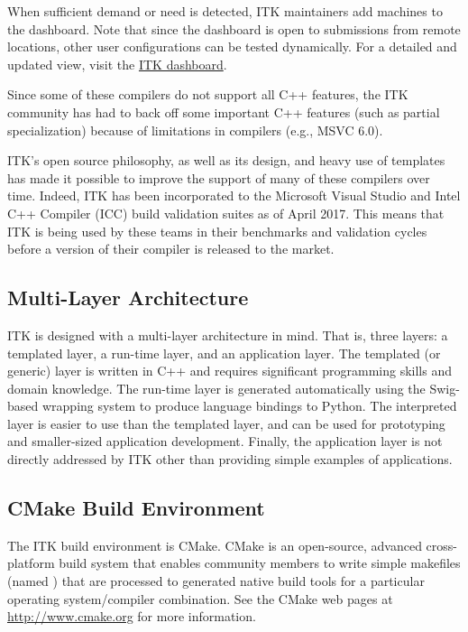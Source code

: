 When sufficient demand or need is detected, ITK maintainers add machines to the
dashboard. Note that since the dashboard is open to submissions from remote
locations, other user configurations can be tested dynamically. For a detailed
and updated view, visit the
\href{https://open.cdash.org/index.php?project=Insight}{ITK dashboard}.

Since some of these compilers do not support all C++ features, the ITK community
has had to back off some important C++ features (such as partial specialization)
because of limitations in compilers (e.g., MSVC 6.0).

ITK's open source philosophy, as well as its design, and heavy use of templates
has made it possible to improve the support of many of these compilers over
time. Indeed, ITK has been incorporated to the Microsoft Visual Studio and Intel
C++ Compiler (ICC) build validation suites as of April 2017. This means that
ITK is being used by these teams in their benchmarks and validation cycles
before a version of their compiler is released to the market.


\subsection{Multi-Layer Architecture}
\label{subsec:MultiLayerArchitecture}

ITK is designed with a multi-layer architecture in mind. That is, three layers:
a templated layer, a run-time layer, and an application layer. The templated (or
generic) layer is written in C++ and requires significant programming skills and
domain knowledge. The run-time layer is generated automatically using the
Swig-based wrapping system to produce language bindings to Python. The
interpreted layer is easier to use than the templated layer, and can be used for
prototyping and smaller-sized application development. Finally, the application
layer is not directly addressed by ITK other than providing simple examples of
applications.

\subsection{CMake Build Environment}
\label{subsec:CMakeBuildEnvironment}

The ITK build environment is CMake. CMake is an open-source, advanced
cross-platform build system that enables community members to write simple
makefiles (named ) that are processed to generated native
build tools for a particular operating system/compiler combination. See the
CMake web pages at \href{http://www.cmake.org}{http://www.cmake.org} for more
information.

